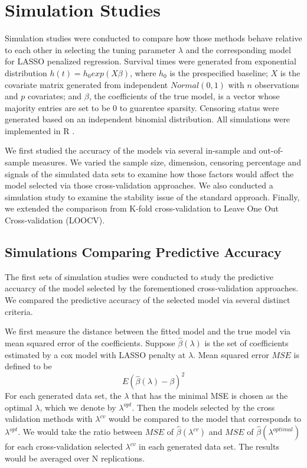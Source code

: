 \section{Simulation Studies}

Simulation studies were conducted to compare how those methods behave relative to each other in selecting the tuning parameter $\lambda$ and the corresponding model for LASSO penalized regression. Survival times were generated from exponential distribution $h(t) = h_{0} exp(X\beta)$, where $h_{0}$ is the prespecified baseline; $X$ is the covariate matrix generated from independent $Normal(0, 1)$ with $n$ observations and $p$ covariates; and $\beta$, the coefficients of the true model, is a vector whose majority entries are set to be 0 to guarentee sparsity. Censoring status were generated based on an independent binomial distribution. All simulations were implemented in R \citep{R}.

We first studied the accuracy of the models via several in-sample and out-of-sample measures. We varied the sample size, dimension, censoring percentage and signals of the simulated data sets to examine how those factors would affect the model selected via those cross-validation approaches. We also conducted a simulation study to examine the stability issue of the standard approach. Finally, we extended the comparison from K-fold cross-validation to Leave One Out Cross-validation (LOOCV).
   
    \subsection {Simulations Comparing Predictive Accuracy}
\par The first sets of simulation studies were conducted to study the predictive accuarcy of the model selected by the forementioned cross-validation approaches. We compared the predictive accuracy of the selected model via several distinct criteria.

\par We first measure the distance between the fitted model and the true model via mean squared error of the coefficients. Suppose $\hat{\beta}(\lambda)$ is the set of coefficients estimated by a cox model with LASSO penalty at $\lambda$. Mean squared error $MSE$ is defined to be 
\begin{equation}
E(\hat{\beta}(\lambda) - \beta)^2
\end{equation}
For each generated data set, the $\lambda$ that has the minimal MSE is chosen as the optimal $\lambda$, which we denote by $\lambda^{opt}$. Then the models selected by the cross validation methods with $\lambda^{cv}$ would be compared to the model that corresponds to $\lambda^{opt}$. We would take the ratio between $MSE$ of $\hat{\beta}(\lambda^{cv})$ and $MSE$ of $\hat{\beta}(\lambda^{optimal})$ for each cross-validation selected $\lambda^{cv}$ in each generated data set. The results would be averaged over N replications. 

